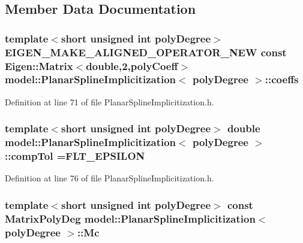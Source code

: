 \subsection{Member Data Documentation}
\hypertarget{classmodel_1_1_planar_spline_implicitization_a9ad146f6d10f2cfe59742c5e1b93f963}{}
\subsubsection[{coeffs}]{\setlength{\rightskip}{0pt plus 5cm}template$<$short unsigned int poly\+Degree$>$ E\+I\+G\+E\+N\+\_\+\+M\+A\+K\+E\+\_\+\+A\+L\+I\+G\+N\+E\+D\+\_\+\+O\+P\+E\+R\+A\+T\+O\+R\+\_\+\+N\+E\+W const Eigen\+::\+Matrix$<$double,2,poly\+Coeff$>$ {\bf model\+::\+Planar\+Spline\+Implicitization}$<$ poly\+Degree $>$\+::coeffs}\label{classmodel_1_1_planar_spline_implicitization_a9ad146f6d10f2cfe59742c5e1b93f963}


Definition at line 71 of file Planar\+Spline\+Implicitization.\+h.

\hypertarget{classmodel_1_1_planar_spline_implicitization_a0bbcc47f5ede12cad09a512e9d77c7a2}{}
\subsubsection[{comp\+Tol}]{\setlength{\rightskip}{0pt plus 5cm}template$<$short unsigned int poly\+Degree$>$ double {\bf model\+::\+Planar\+Spline\+Implicitization}$<$ poly\+Degree $>$\+::comp\+Tol =F\+L\+T\+\_\+\+E\+P\+S\+I\+L\+O\+N\hspace{0.3cm}{\ttfamily [static]}}\label{classmodel_1_1_planar_spline_implicitization_a0bbcc47f5ede12cad09a512e9d77c7a2}


Definition at line 76 of file Planar\+Spline\+Implicitization.\+h.

\hypertarget{classmodel_1_1_planar_spline_implicitization_a06a484823965930f62c9b30ce44555f0}{}
\subsubsection[{Mc}]{\setlength{\rightskip}{0pt plus 5cm}template$<$short unsigned int poly\+Degree$>$ const Matrix\+Poly\+Deg {\bf model\+::\+Planar\+Spline\+Implicitization}$<$ poly\+Degree $>$\+::Mc}\label{classmodel_1_1_planar_spline_implicitization_a06a484823965930f62c9b30ce44555f0}


